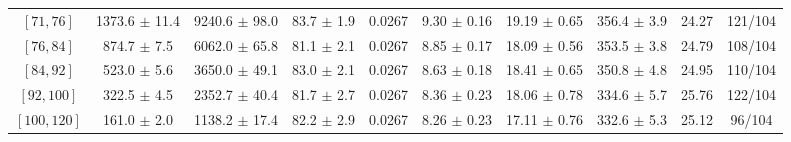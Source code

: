 \begin{tabular}{c||c|c|c|c|c|c|c||c|c}
$[71, 76]$ & 1373.6 $\pm$ 11.4 & 9240.6 $\pm$ 98.0 & 83.7 $\pm$ 1.9 & 0.0267 & 9.30 $\pm$ 0.16 & 19.19 $\pm$ 0.65 & 356.4 $\pm$ 3.9 & 24.27 & 121/104\\
$[76, 84]$ & 874.7 $\pm$ 7.5 & 6062.0 $\pm$ 65.8 & 81.1 $\pm$ 2.1 & 0.0267 & 8.85 $\pm$ 0.17 & 18.09 $\pm$ 0.56 & 353.5 $\pm$ 3.8 & 24.79 & 108/104\\
$[84, 92]$ & 523.0 $\pm$ 5.6 & 3650.0 $\pm$ 49.1 & 83.0 $\pm$ 2.1 & 0.0267 & 8.63 $\pm$ 0.18 & 18.41 $\pm$ 0.65 & 350.8 $\pm$ 4.8 & 24.95 & 110/104\\
$[92, 100]$ & 322.5 $\pm$ 4.5 & 2352.7 $\pm$ 40.4 & 81.7 $\pm$ 2.7 & 0.0267 & 8.36 $\pm$ 0.23 & 18.06 $\pm$ 0.78 & 334.6 $\pm$ 5.7 & 25.76 & 122/104\\
$[100, 120]$ & 161.0 $\pm$ 2.0 & 1138.2 $\pm$ 17.4 & 82.2 $\pm$ 2.9 & 0.0267 & 8.26 $\pm$ 0.23 & 17.11 $\pm$ 0.76 & 332.6 $\pm$ 5.3 & 25.12 & 96/104\\
\end{tabular}

